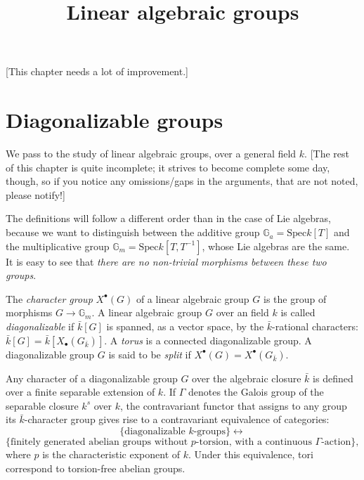 

%


\title{Linear algebraic groups}


\maketitle

\label{section-phantom}

\tableofcontents

[This chapter needs a lot of improvement.]

\section{Diagonalizable groups}
\label{section-diagonalizable-groups}

We pass to the study of linear algebraic groups, over a general field $k$. [The rest of this chapter is quite incomplete; it strives to become complete some day, though, so if you notice any omissions/gaps in the arguments, that are not noted, please notify!]


The definitions will follow a different order than in the case of Lie algebras, because we want to distinguish between the additive group $\mathbb G_a = \text{Spec} k[T]$ and the multiplicative group $\mathbb G_m = \text{Spec} k[T,T^{-1}]$, whose Lie algebras are the same. It is easy to see that \emph{there are no non-trivial morphisms between these two groups}. 


\begin{definition}
\label{definition-characters-diagonalizable-group} 
The {\it character group} $X^\bullet(G)$ of a linear algebraic group $G$ is the group of morphisms $G\to \mathbb G_m$. 
A linear algebraic group $G$ over an field $k$ is called \emph{diagonalizable} if $\bar k[G]$ is spanned, as a vector space, by the $\bar k$-rational characters: $\bar k[G] = \bar k[X_\bullet(G_{\bar k})]$. A {\it torus} is a connected diagonalizable group. A diagonalizable group $G$ is said to be {\it split} if $X^\bullet(G) = X^\bullet(G_{\bar k})$.
\end{definition}

\begin{theorem}
\label{theorem-diagonalizable-equivalence}
Any character of a diagonalizable group $G$ over the algebraic closure $\bar k$ is defined over a finite separable extension of $k$. If $\Gamma$ denotes the Galois group of the separable closure $k^s$ over $k$, the contravariant functor that assigns to any group its $\bar k$-character group gives rise to a contravariant equivalence of categories:
$$\{\mbox{diagonalizable $k$-groups}\} \leftrightarrow $$
$$\{\mbox{finitely generated abelian groups without $p$-torsion, with a continuous $\Gamma$-action}\},$$
where $p$ is the characteristic exponent of $k$.
Under this equivalence, tori correspond to torsion-free abelian groups.
\end{theorem}

